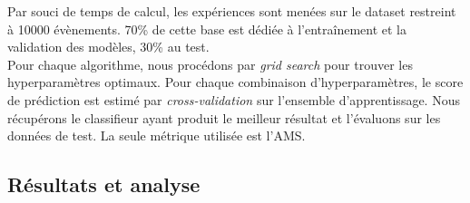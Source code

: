 \documentclass[12pt]{article}
\begin{document}
Par souci de temps de calcul, les expériences sont menées sur le
dataset restreint à 10000 évènements. 70\% de cette base est dédiée à
l'entraînement et la validation des modèles, 30\% au test.  \\

Pour chaque algorithme, nous procédons par \emph{grid search} pour trouver les
hyperparamètres optimaux. Pour chaque combinaison d'hyperparamètres, le score de
prédiction est estimé par \emph{cross-validation} sur l'ensemble
d'apprentissage. Nous récupérons le classifieur ayant produit le meilleur
résultat et l'évaluons sur les données de test. La seule métrique
utilisée est l'AMS. 

\subsection{Résultats et analyse}

\begin{table}[H]
\centering
{}
\caption{Paramètres optimaux pour le SVM (accuracy, $n=1000$)}
\end{table}

\begin{table}[H]
\centering
{}
\caption{Paramètres optimaux pour les méthodes d'ensemble (accuracy, $n=1000$)}
\end{table}


\begin{table}[H]
    \caption{Performances obtenues par chaque méthode}
    \label{tab:ensemble-results}
\end{table}



\newpage
\printbibliography
\end{document}

